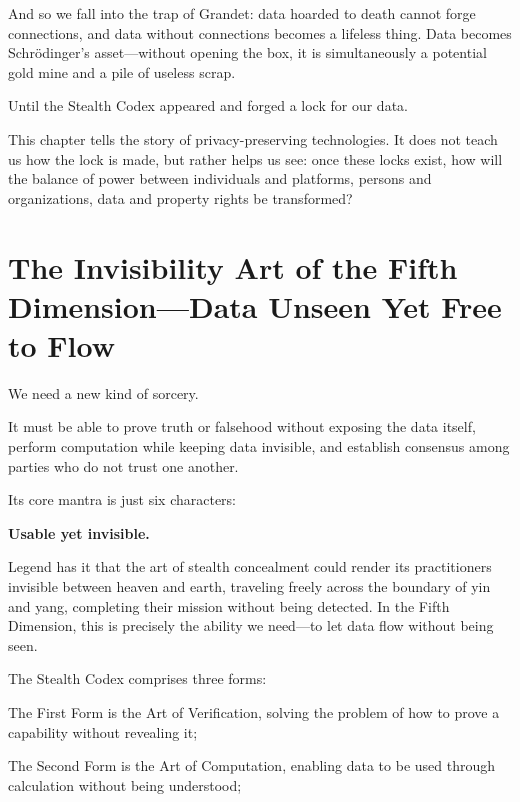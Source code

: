 And so we fall into the trap of Grandet:
data hoarded to death cannot forge connections, and data without connections becomes a lifeless thing.
Data becomes Schr\"{o}dinger's asset---without opening the box, it is simultaneously a potential gold mine and a pile of useless scrap.

\vspace{1em}

Until the Stealth Codex appeared and forged a lock for our data.

This chapter tells the story of privacy-preserving technologies. It does not teach us how the lock is made, but rather helps us see: once these locks exist, how will the balance of power between individuals and platforms, persons and organizations, data and property rights be transformed?


\section{The Invisibility Art of the Fifth Dimension---Data Unseen Yet Free to Flow}

We need a new kind of sorcery.

It must be able to prove truth or falsehood without exposing the data itself, perform computation while keeping data invisible, and establish consensus among parties who do not trust one another.

\vspace{1em}

Its core mantra is just six characters:

\begin{importantbox}
\textbf{Usable yet invisible.}
\end{importantbox}


Legend has it that the art of stealth concealment could render its practitioners invisible between heaven and earth, traveling freely across the boundary of yin and yang, completing their mission without being detected. In the Fifth Dimension, this is precisely the ability we need---to let data flow without being seen.

\vspace{1em}

The Stealth Codex comprises three forms:

The First Form is the Art of Verification, solving the problem of how to prove a capability without revealing it;

The Second Form is the Art of Computation, enabling data to be used through calculation without being understood;

